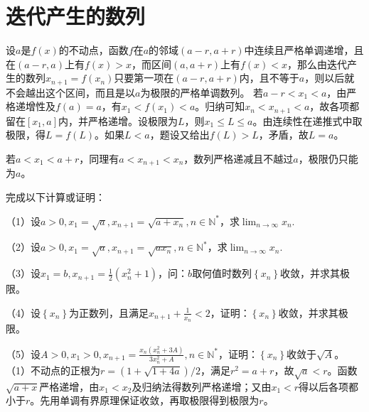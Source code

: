 \par\addvspace{12pt}

\section{迭代产生的数列}

\label{sol:sec:analysis:8}

设\(a\)是\(f \left( x \right)\)的不动点，函数\(f\)在\(a\)的邻域\(\left( a - r , a + r \right)\)中连续且严格单调递增，且在\(\left( a - r , a \right)\)上有\(f \left( x \right) > x\)，而区间\(\left( a , a + r \right)\)上有\(f \left( x \right) < x\)，那么由迭代产生的数列\(x_{n + 1} = f \left( x_{n} \right)\)只要第一项在\(\left( a - r , a + r \right)\)内，且不等于\(a\)，则以后就不会越出这个区间，而且是以\(a\)为极限的严格单调数列。
\solutionanswer
若\(a-r<x_1<a\)，由严格递增性及\(f(a)=a\)，有\(x_1<f(x_1)<a\)。归纳可知\(x_n<x_{n+1}<a\)，故各项都留在\([x_1,a]\)内，并严格递增。设极限为\(L\)，则\(x_1\le L\le a\)。由连续性在递推式中取极限，得\(L=f(L)\)。如果\(L<a\)，题设又给出\(f(L)>L\)，矛盾，故\(L=a\)。

若\(a<x_1<a+r\)，同理有\(a<x_{n+1}<x_n\)，数列严格递减且不越过\(a\)，极限仍只能为\(a\)。


完成以下计算或证明：

    （1）设\(a > 0 , x_{1} = \sqrt{a} , x_{n + 1} = \sqrt{a + x_{n}} , n \in \mathbb{N}^{*}\)，求\(\lim_{n \to \infty} x_{n}\).

    （2）设\(a > 0 , x_{1} = \sqrt{a} , x_{n + 1} = \sqrt{a x_{n}} , n \in \mathbb{N}^{*}\)，求\(\lim_{n \to \infty} x_{n}\).

    （3）设\(x_{1} = b , x_{n + 1} = \frac{1}{2} \left( x_{n}^{2} + 1 \right)\)，问：\(b\)取何值时数列\(\left\{ x_{n} \right\}\)收敛，并求其极限。

    （4）设\(\left\{ x_{n} \right\}\)为正数列，且满足\(x_{n + 1} + \frac{1}{x_{n}} < 2\)，证明：\(\left\{ x_{n} \right\}\)收敛，并求其极限。

    （5）设\(A > 0 , x_{1} > 0 , x_{n + 1} = \frac{x_{n} \left( x_{n}^{2} + 3 A \right)}{3 x_{n}^{2} + A} , n \in \mathbb{N}^{*}\)，证明：\(\left\{ x_{n} \right\}\)收敛于\(\sqrt{A}\)。
\solutionanswer
（1）不动点的正根为\(r=(1+\sqrt{1+4a})/2\)，满足\(r^2=a+r\)，故\(\sqrt a<r\)。函数\(\sqrt{a+x}\)严格递增，由\(x_1<x_2\)及归纳法得数列严格递增；又由\(x_1<r\)得以后各项都小于\(r\)。先用单调有界原理保证收敛，再取极限得到极限为\(r\)。

